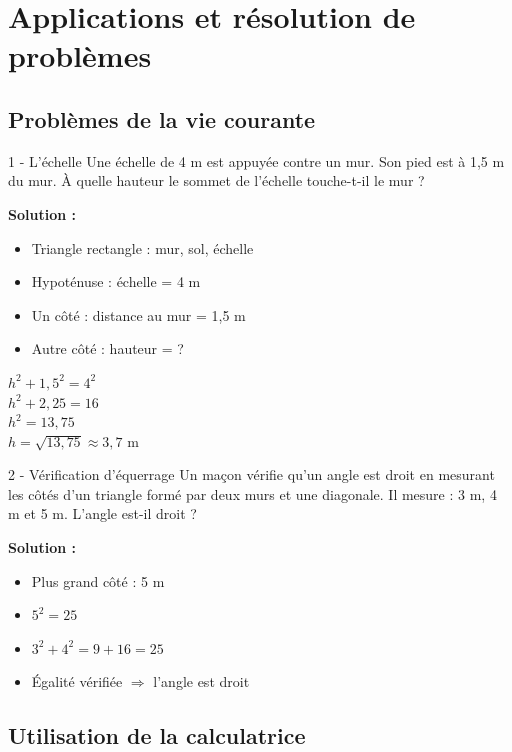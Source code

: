 \section{Applications et résolution de problèmes}

\subsection{Problèmes de la vie courante}

\begin{exercice}{1 - L'échelle}
Une échelle de 4 m est appuyée contre un mur. Son pied est à 1,5 m du mur. À quelle hauteur le sommet de l'échelle touche-t-il le mur ?

\textbf{Solution :}
\begin{itemize}
    \item Triangle rectangle : mur, sol, échelle
    \item Hypoténuse : échelle = 4 m
    \item Un côté : distance au mur = 1,5 m
    \item Autre côté : hauteur = ?
\end{itemize}

$h^2 + 1,5^2 = 4^2$\\
$h^2 + 2,25 = 16$\\
$h^2 = 13,75$\\
$h = \sqrt{13,75} \approx 3,7$ m
\end{exercice}

\begin{exercice}{2 - Vérification d'équerrage}
Un maçon vérifie qu'un angle est droit en mesurant les côtés d'un triangle formé par deux murs et une diagonale. Il mesure : 3 m, 4 m et 5 m. L'angle est-il droit ?

\textbf{Solution :}
\begin{itemize}
    \item Plus grand côté : 5 m
    \item $5^2 = 25$
    \item $3^2 + 4^2 = 9 + 16 = 25$
    \item Égalité vérifiée $\Rightarrow$ l'angle est droit
\end{itemize}
\end{exercice}

\subsection{Utilisation de la calculatrice}

